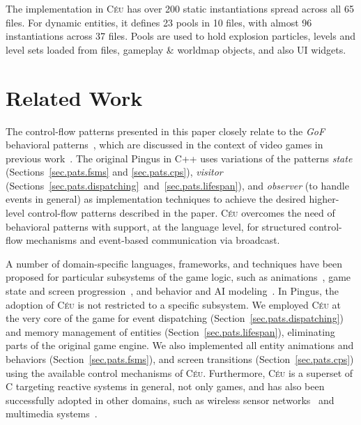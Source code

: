 \documentclass[10pt, conference, compsocconf]{IEEEtran}
\newcommand{\CEU}{\textsc{C\'{e}u}\xspace}
\newcommand{\code}[1] {{\small{\texttt{#1}}}}
\begin{document}
The implementation in \CEU has over 200 static instantiations spread across all
65 files.
For dynamic entities, it defines 23 pools in 10 files, with almost 96
instantiations across 37 files.
Pools are used to hold explosion particles, levels and level sets loaded from
files, gameplay \& worldmap objects, and also UI widgets.

\section{Related Work}
\label{sec.related}

The control-flow patterns presented in this paper closely relate to the
\emph{GoF} behavioral patterns~\cite{gof}, which are discussed in the context
of video games in previous
work~\cite{games.patterns,games.gof.2015,games.gof.2007}.
%
The original Pingus in C++ uses variations of the patterns
    \emph{state} (Sections~\ref{sec.pats.fsms} and \ref{sec.pats.cps}),
    \emph{visitor} (Sections~\ref{sec.pats.dispatching}~and~\ref{sec.pats.lifespan}), and
    \emph{observer} (to handle events in general)
as implementation techniques to achieve the desired higher-level
control-flow patterns described in the paper.
%
\CEU overcomes the need of behavioral patterns with support, at the language
level, for structured control-flow mechanisms and event-based communication via
broadcast.
%

A number of domain-specific languages, frameworks, and techniques have been
proposed for particular subsystems of the game logic, such as
animations~\cite{games.anims.2006,games.anims.2003,games.anims.1996,games.anims.1982},
game state and screen progression~\cite{games.fsms.2006.1,games.fsms.2006.2}, and
behavior and AI modeling~\cite{games.bts,games.bts.unreal}.
%
In Pingus, the adoption of \CEU is not restricted to a specific subsystem.
We employed \CEU at the very core of the game for event dispatching
(Section~\ref{sec.pats.dispatching}) and memory management of entities
(Section~\ref{sec.pats.lifespan}), eliminating parts of the original game
engine.
We also implemented all entity animations and behaviors
(Section~\ref{sec.pats.fsms}), and screen transitions
(Section~\ref{sec.pats.cps})
using the available control mechanisms of \CEU.
%
Furthermore, \CEU is a superset of C targeting reactive systems in general, not
only games, and has also been successfully adopted in other domains, such as
    wireless sensor networks~\cite{ceu.sensys13,ceu.terra} and
    multimedia systems~\cite{ceumedia.webmedia16}.
\end{document}

